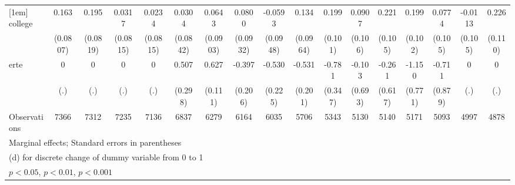 {\begin{tabular}{l*{16}{c}}
[1em]
college             &       0.163\sym{*}  &       0.195\sym{*}  &      0.0317         &      0.0234         &      0.0304         &      0.0643         &      0.0800         &     -0.0593         &       0.134         &       0.199\sym{*}  &      0.0907         &       0.221\sym{*}  &       0.199         &      0.0774         &     -0.0113         &       0.226\sym{*}  \\
                    &    (0.0807)         &    (0.0819)         &    (0.0815)         &    (0.0815)         &    (0.0842)         &    (0.0903)         &    (0.0932)         &    (0.0948)         &    (0.0964)         &     (0.101)         &     (0.106)         &     (0.105)         &     (0.102)         &     (0.105)         &     (0.105)         &     (0.110)         \\
[1em]
erte                &           0         &           0         &           0         &           0         &       0.507         &       0.627\sym{***}&      -0.397         &      -0.530\sym{*}  &      -0.531\sym{**} &      -0.781\sym{*}  &      -0.103         &      -0.261         &      -1.150         &      -0.711         &           0         &           0         \\
                    &         (.)         &         (.)         &         (.)         &         (.)         &     (0.298)         &     (0.111)         &     (0.206)         &     (0.225)         &     (0.201)         &     (0.347)         &     (0.693)         &     (0.617)         &     (0.771)         &     (0.879)         &         (.)         &         (.)         \\
\hline
Observations        &        7366         &        7312         &        7235         &        7136         &        6837         &        6279         &        6164         &        6035         &        5706         &        5343         &        5130         &        5140         &        5171         &        5093         &        4997         &        4878         \\
\hline\hline
\multicolumn{17}{l}{\footnotesize Marginal effects; Standard errors in parentheses}\\
\multicolumn{17}{l}{\footnotesize  (d) for discrete change of dummy variable from 0 to 1}\\
\multicolumn{17}{l}{\footnotesize \sym{*} \(p<0.05\), \sym{**} \(p<0.01\), \sym{***} \(p<0.001\)}\\
\end{tabular}
}
